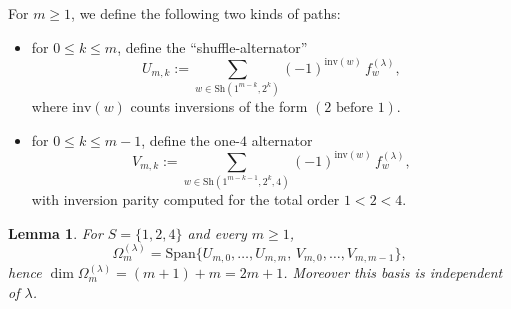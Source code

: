 \documentclass[11pt]{amsart}
\theoremstyle{plain}
\newtheorem{lemma}[theorem]{Lemma}
\theoremstyle{definition}
\numberwithin{equation}{section}
\begin{document}
For $m\ge 1$, we define the following two kinds of paths:
\begin{itemize}
    \item[(i)] for $0\le k\le m$, define the ``shuffle-alternator''
\[
U_{m,k}:=\sum_{w\in\mathrm{Sh}(1^{m-k},2^k)} (-1)^{\mathrm{inv}(w)}\, f^{(\lambda)}_w,
\]
where $\mathrm{inv}(w)$ counts inversions of the form $(2\text{ before }1)$.
    \item[(ii)] for $0\le k\le m-1$, define the one-$4$ alternator
\[
V_{m,k}:=\sum_{w\in\mathrm{Sh}(1^{m-k-1},2^k,4)} (-1)^{\mathrm{inv}(w)}\, f^{(\lambda)}_w,
\]
with inversion parity computed for the total order $1<2<4$.
\end{itemize}


\begin{lemma}
For $S=\{1,2,4\}$ and every $m\ge 1$,
\[
\Omega_m^{(\lambda)}=\mathrm{Span}\{U_{m,0},\dots,U_{m,m},\, V_{m,0},\dots,V_{m,m-1}\},
\]
hence $\dim \Omega_m^{(\lambda)}= (m+1)+m=2m+1$.
Moreover this basis is independent of $\lambda$.
\end{lemma}
\end{document}
